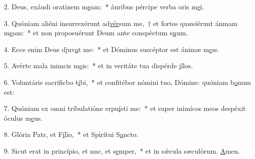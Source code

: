 2. Deus, exáudi oratinem m\uline{e}am:~* áuribus pércipe verba oris m\uline{e}i.\par 
3. Quóniam aliéni insurrexérunt ad\uline{vér}sum me,~† et fortes quæsiérunt ánmam m\uline{e}am:~* et non proposuérunt Deum ante conspéctum s\uline{u}um.\par 
4. Ecce enim Deus djuv\uline{a}t me:~* et Dóminus suscéptor est ánimæ m\uline{e}æ.\par 
5. Avérte mala inimcis m\uline{e}is:~* et in veritáte tua dispérde \uline{i}llos.\par 
6. Voluntárie sacrificbo t\uline{i}bi,~* et confitébor nómini tuo, Dómine: quóniam b\uline{o}num est:\par 
7. Quóniam ex omni tribulatióne erpu\uline{í}sti me:~* et super inimícos meos despéxit óculus m\uline{e}us.\par 
8. Glória Patr, et F\uline{í}lio,~* et Spirítui S\uline{a}ncto.\par 
9. Sicut erat in princípio, et nnc, et s\uline{e}mper,~* et in sǽcula sæculórum. \uline{A}men.\par 

